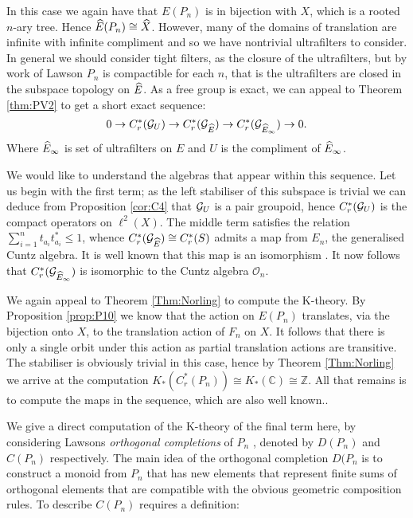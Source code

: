 \begin{example}
\begin{example}
In this case we again have that $E(P_{n})$ is in bijection with $X$, which is a rooted $n$-ary tree. Hence $\widehat{E}(P_{n}) \cong \widehat{X}$. However, many of the domains of translation are infinite with infinite compliment and so we have nontrivial ultrafilters to consider. In general we should consider tight filters, as the closure of the ultrafilters, but by work of Lawson \cite{lawson-2011-1} $P_{n}$ is compactible for each $n$, that is the ultrafilters are closed in the subspace topology on $\widehat{E}$. As a free group is exact, we can appeal to Theorem \ref{thm:PV2} to get a short exact sequence:
\begin{equation*}
0 \rightarrow C^{*}_{r}(\mathcal{G}_{U}) \rightarrow C^{*}_{r}(\mathcal{G}_{\widehat{E}}) \rightarrow C^{*}_{r}(\mathcal{G}_{\widehat{E}_{\infty}}) \rightarrow 0.
\end{equation*}
Where $\widehat{E}_{\infty}$ is set of ultrafilters on $E$ and $U$ is the compliment of $\widehat{E}_{\infty}$.

We would like to understand the algebras that appear within this sequence. Let us begin with the first term; as the left stabiliser of this subspace is trivial we can deduce from Proposition \ref{cor:C4} that $\mathcal{G}_{U}$ is a pair groupoid, hence $C^{*}_{r}(\mathcal{G}_{U})$ is the compact operators on $\ell^{2}(X)$. The middle term satisfies the relation $\sum_{i=1}^{n}t_{a_{i}}t_{a_{i}}^{*} \leq 1$, whence $C^{*}_{r}(\mathcal{G}_{\widehat{E}}) \cong C^{*}_{r}(S)$ admits a map from $E_{n}$, the generalised Cuntz algebra. It is well known that this map is an isomorphism \cite{MR1724106,MR584266}. It now follows that $C^{*}_{r}(\mathcal{G}_{\widehat{E}_{\infty}})$ is isomorphic to the Cuntz algebra $\mathcal{O}_{n}$.

We again appeal to Theorem \ref{Thm:Norling} to compute the K-theory. By Proposition \ref{prop:P10} we know that the action on $E(P_{n})$ translates, via the bijection onto $X$, to the translation action of $F_{n}$ on $X$. It follows that there is only a single orbit under this action as partial translation actions are transitive. The stabiliser is obviously trivial in this case, hence by Theorem \ref{Thm:Norling} we arrive at the computation $K_{*}(C^{*}_{r}(P_{n})) \cong K_{*}(\mathbb{C})\cong \mathbb{Z}$. All that remains is to compute the maps in the sequence, which are also well known..

We give a direct computation of the K-theory of the final term here, by considering Lawsons \textit{orthogonal completions} of $P_{n}$ \cite{lawson-2011-1}, denoted by $D(P_{n})$ and $C(P_{n})$ respectively. The main idea of the orthogonal completion $D(P_{n}$ is to construct a monoid from $P_{n}$ that has new elements that represent finite sums of orthogonal elements that are compatible with the obvious geometric composition rules. To describe $C(P_{n})$ requires a definition:


\end{example}
\end{example}

